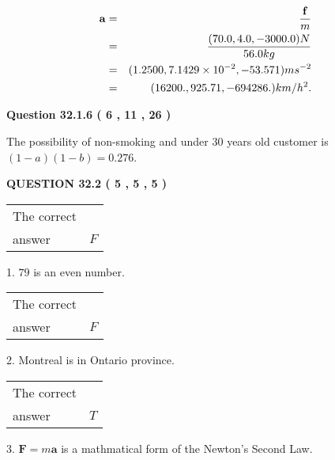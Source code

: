 \documentclass[12pt]{article}
\begin{document}
\begin{eqnarray*}
\mathbf{a}&=&\frac{\mathbf{f}}m  \\
&=&\frac{(
70.0 ,
4.0 ,
-3000.0 )N
}{ %
56.0 kg}  \\
&=&(
1.2500 ,
7.1429 \times 10^{-2},
-53.571
)ms^{-2} \\
&=&(
16200. ,
925.71 ,
-694286.
)km/h^2.
\end{eqnarray*}
 
 
 
  
\vspace{0.2in}
  
{\textbf{\Large{Question
32.1.6 
 (           6 ,          11 ,          26 )
}}}
  
  
 
 
\noindent{}

The possibility of  %
 non-smoking and  %
under 30 years old
customer is $ (1-a)(1-b) =  %
0.276 $.
 
 
  
\vspace{0.2in}
  
{\textbf{\Large{QUESTION
32.2 
 (           5 ,           5 ,           5 )
}}}
  
  
 
 
\noindent{}

 
\noindent\begin{tabular}{|l|l|}\hline The correct & \\
          answer &  %
$F$ \\ \hline \end{tabular}
1. $ %
79$ is an  %
even number.
 
\noindent\begin{tabular}{|l|l|}\hline The correct & \\
          answer &  %
$F$ \\ \hline \end{tabular}
2.  %
Montreal is in  %
Ontario province.
 
\noindent\begin{tabular}{|l|l|}\hline The correct & \\
          answer &  %
$T$ \\ \hline \end{tabular}
3.  %
$\mathbf{F}=m\mathbf{a}$ is a mathmatical form of  %
the Newton's Second Law.
 
 
 
\end{document}
